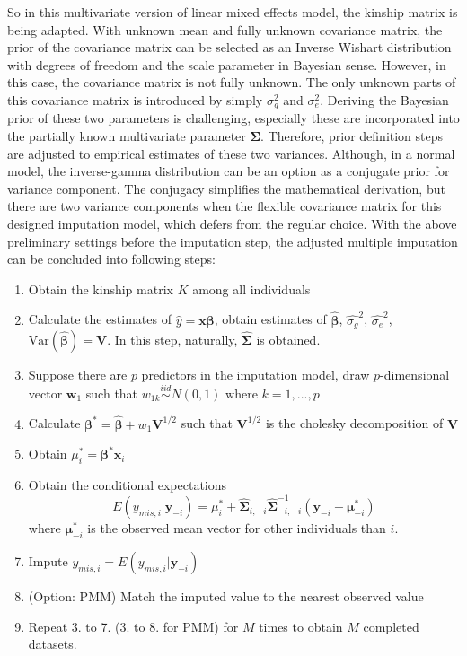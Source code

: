 So in this multivariate version of linear mixed effects model, the kinship matrix is being adapted. 
With unknown mean and fully unknown covariance matrix, the prior of the covariance matrix can be selected as an Inverse Wishart distribution with degrees of freedom and the scale parameter in Bayesian sense. 
However, in this case, the covariance matrix is not fully unknown. 
The only unknown parts of this covariance matrix is introduced by simply $\sigma_g^2$ and $\sigma_e^2$. 
Deriving the Bayesian prior of these two parameters is challenging, especially these are incorporated into the partially known multivariate parameter $\boldsymbol{\Sigma}$. 
Therefore, prior definition steps are adjusted to empirical estimates of these two variances. 
Although, in a normal model, the inverse-gamma distribution can be an option as a conjugate prior for variance component. 
The conjugacy simplifies the mathematical derivation, but there are two variance components when the flexible covariance matrix for this designed imputation model, which defers from the regular choice. 
With the above preliminary settings before the imputation step, the adjusted multiple imputation can be concluded into following steps: 
\begin{enumerate} 
    \item Obtain the kinship matrix $K$ among all individuals 
    \item Calculate the estimates of $\hat{y}=\mathbf{x}\boldsymbol{\beta}$, obtain estimates of $\hat{\boldsymbol{\beta}}$, $\hat{\sigma_g}^2$, $\hat{\sigma_e}^2$, $\text{Var}(\hat{\boldsymbol{\beta}})=\mathbf{V}$. In this step, naturally, $\boldsymbol{\hat{\Sigma}}$ is obtained.
    \item Suppose there are $p$ predictors in the imputation model, draw $p$-dimensional vector $\mathbf{w}_1$ such that $w_{1k}\stackrel{iid}{\sim} N(0,1)$ where $k=1,...,p$
    \item Calculate $\boldsymbol{\beta}^*=\hat{\boldsymbol{\beta}}+w_1\mathbf{V}^{1/2}$ such that $\mathbf{V}^{1/2}$ is the cholesky decomposition of $\mathbf{V}$
    \item Obtain $\mu_i^*=\boldsymbol{\beta}^*\mathbf{x}_i$
    \item Obtain the conditional expectations 
    \begin{equation}\label{eq:conditionalexpectation}
        E(y_{mis,i}|\mathbf{y}_{-i})=\mu_i^*+\hat{\boldsymbol{\Sigma}}_{i,-i}\hat{\boldsymbol{\Sigma}}_{-i,-i}^{-1}(\mathbf{y}_{-i}-\boldsymbol{\mu}^*_{-i})
    \end{equation}
    where $\boldsymbol{\mu}_{-i}^*$ is the observed mean vector for other individuals than $i$.
    \item Impute $y_{mis,i}=E(y_{mis,i}|\mathbf{y}_{-i})$
    \item (Option: PMM) Match the imputed value to the nearest observed value
    \item Repeat 3. to 7. (3. to 8. for PMM) for $M$ times to obtain $M$ completed datasets.
\end{enumerate}

